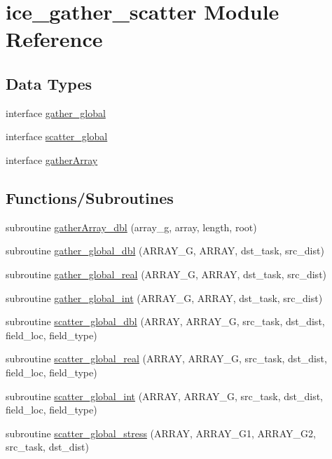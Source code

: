 \hypertarget{namespaceice__gather__scatter}{
\section{ice\_\-gather\_\-scatter Module Reference}
\label{namespaceice__gather__scatter}
}
\subsection*{Data Types}
\begin{DoxyCompactItemize}
\item 
interface \hyperlink{interfaceice__gather__scatter_1_1gather__global}{gather\_\-global}
\item 
interface \hyperlink{interfaceice__gather__scatter_1_1scatter__global}{scatter\_\-global}
\item 
interface \hyperlink{interfaceice__gather__scatter_1_1gatherArray}{gatherArray}
\end{DoxyCompactItemize}
\subsection*{Functions/Subroutines}
\begin{DoxyCompactItemize}
\item 
subroutine \hyperlink{namespaceice__gather__scatter_af2e301c3ae3447184de4cf26a6adae4c}{gatherArray\_\-dbl} (array\_\-g, array, length, root)
\item 
subroutine \hyperlink{namespaceice__gather__scatter_a21d73cccfa33b7e215f8dbe2af60ea8d}{gather\_\-global\_\-dbl} (ARRAY\_\-G, ARRAY, dst\_\-task, src\_\-dist)
\item 
subroutine \hyperlink{namespaceice__gather__scatter_a3bfaad5ff40eaa2c23e804f7e75d51f9}{gather\_\-global\_\-real} (ARRAY\_\-G, ARRAY, dst\_\-task, src\_\-dist)
\item 
subroutine \hyperlink{namespaceice__gather__scatter_a7d152b84c73f88cb892a723d88f54d13}{gather\_\-global\_\-int} (ARRAY\_\-G, ARRAY, dst\_\-task, src\_\-dist)
\item 
subroutine \hyperlink{namespaceice__gather__scatter_a0cdcbc669124b62ca3daae1382379d53}{scatter\_\-global\_\-dbl} (ARRAY, ARRAY\_\-G, src\_\-task, dst\_\-dist, field\_\-loc, field\_\-type)
\item 
subroutine \hyperlink{namespaceice__gather__scatter_a55328cf7afed78a137ab75bd786a4d79}{scatter\_\-global\_\-real} (ARRAY, ARRAY\_\-G, src\_\-task, dst\_\-dist, field\_\-loc, field\_\-type)
\item 
subroutine \hyperlink{namespaceice__gather__scatter_a73a3c6d85b75937079388303c18732cb}{scatter\_\-global\_\-int} (ARRAY, ARRAY\_\-G, src\_\-task, dst\_\-dist, field\_\-loc, field\_\-type)
\item 
subroutine \hyperlink{namespaceice__gather__scatter_a484f45410ad7c18c07379d8bd0400caf}{scatter\_\-global\_\-stress} (ARRAY, ARRAY\_\-G1, ARRAY\_\-G2, src\_\-task, dst\_\-dist)
\end{DoxyCompactItemize}


